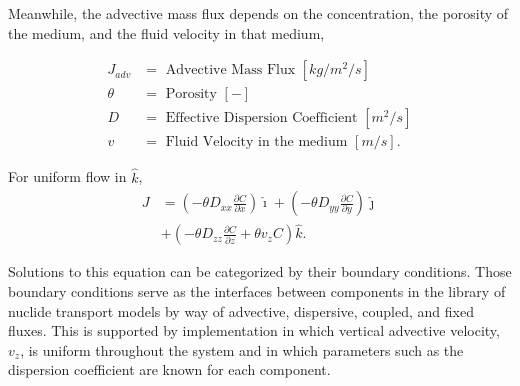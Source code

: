 Meanwhile, the advective mass flux depends on the concentration, the porosity 
of the medium, and the fluid velocity in that medium, 

    \begin{align}
      J_{adv} &= \mbox{ Advective Mass Flux }[kg/m^2/s]\nonumber\\
      \theta &= \mbox{ Porosity }[-] \nonumber\\
      D &= \mbox{ Effective Dispersion Coefficient }[m^2/s]\nonumber\\
      v &= \mbox{ Fluid Velocity in the medium }[m/s].\nonumber
    \end{align}

For uniform flow in $\hat{k}$, 
    \begin{align}
      J &=\left(-\theta D_{xx} \frac{\partial C}{\partial x}
             \right)\hat{\imath}
             + \left( -\theta D_{yy} \frac{\partial C}{\partial y}
            \right)\hat{\jmath}\nonumber\\
            &+ \left( -\theta D_{zz} \frac{\partial C}{\partial z}
             + \theta v_zC \right)\hat{k}.
      \label{unidirflow}
    \end{align}

Solutions to this equation can be categorized by their boundary conditions.  
Those boundary conditions serve as the interfaces between components in the 
\Cyder library of nuclide transport models by way of advective, dispersive, 
coupled, and fixed fluxes.  This is supported by implementation in which 
vertical advective velocity, $v_z$, is uniform throughout the system and in which 
parameters such as the dispersion coefficient are known for each component. 




